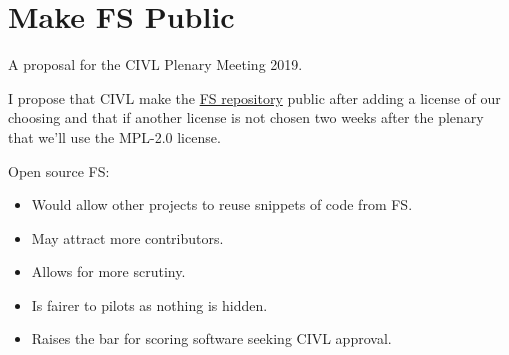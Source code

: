 \documentclass{article}
\begin{document}
\section*{Make FS Public}

A proposal for the CIVL Plenary Meeting 2019.

I propose that CIVL make the \href{https://github.com/FAI-CIVL/FS}{FS
repository} public after adding a license of our choosing and that if another
license is not chosen two weeks after the plenary that we'll use the MPL-2.0
license.

Open source FS:

\begin{itemize}
    \item Would allow other projects to reuse snippets of code from FS.
    \item May attract more contributors.
    \item Allows for more scrutiny.
    \item Is fairer to pilots as nothing is hidden.
    \item Raises the bar for scoring software seeking CIVL approval.
\end{itemize}
\end{document}
